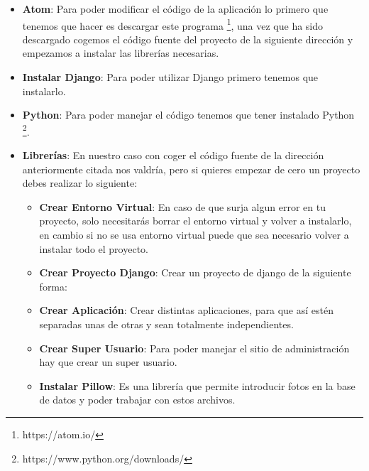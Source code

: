 \begin{itemize}
	\item \textbf{Atom}: Para poder modificar el código de la aplicación lo primero que tenemos que hacer es descargar este programa \footnote{https://atom.io/}, una vez que ha sido descargado cogemos el código fuente del proyecto de la siguiente dirección \cite{Repositorio} y empezamos a instalar las librerías necesarias.
	
	\item \textbf{Instalar Django}: Para poder utilizar Django primero tenemos que instalarlo.
	
	\item \textbf{Python}: Para poder manejar el código tenemos que tener instalado Python \footnote{https://www.python.org/downloads/}.
	
	\item \textbf{Librerías}: En nuestro caso con coger el código fuente de la dirección anteriormente citada nos valdría, pero si quieres empezar de cero un proyecto debes realizar lo siguiente:
	
		\begin{itemize}
			\item \textbf{Crear Entorno Virtual}: En caso de que surja algun error en tu proyecto, solo necesitarás borrar el entorno virtual y volver a instalarlo, en cambio si no se usa entorno virtual puede que sea necesario volver a instalar todo el proyecto.
			
			\item \textbf{Crear Proyecto Django}: Crear un proyecto de django de la siguiente forma: 
			
			\item \textbf{Crear Aplicación}: Crear distintas aplicaciones, para que así estén separadas unas de otras y sean totalmente independientes.
			
			\item \textbf{Crear Super Usuario}: Para poder manejar el sitio de administración hay que crear un super usuario.
			
			\item \textbf{Instalar Pillow}: Es una librería que permite introducir fotos en la base de datos y poder trabajar con estos archivos.
			
		\end{itemize}
\end{itemize}

